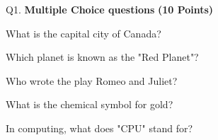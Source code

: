 \documentclass[a4paper,12pt]{exam}  %
\begin{document}
\begin{flushleft}
Q1. \textbf{Multiple Choice questions}\hspace*{\fill} \textbf{(10 Points)}
\end{flushleft}

\begin{questions}
\question What is the capital city of Canada?

\question Which planet is known as the "Red Planet"?

\question Who wrote the play Romeo and Juliet?

\question  What is the chemical symbol for gold?

\question In computing, what does "CPU" stand for?
\end{questions}

\newpage

\showallanswers
\end{document}
